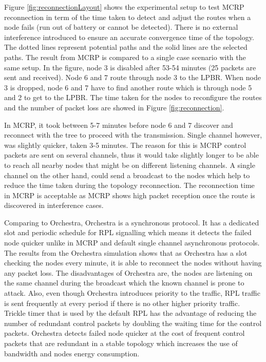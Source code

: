 
Figure \ref{fig:reconnectionLayout} shows the experimental setup to test MCRP reconnection in term of the time taken to detect and adjust the routes when a node fails (run out of battery or cannot be detected). There is no external interference introduced to ensure an accurate convergence time of the topology. The dotted lines represent potential paths and the solid lines are the selected paths. The result from MCRP is compared to a single case scenario with the same setup.
In the figure, node 3 is disabled after 53-54 minutes (25 packets are sent and received). Node 6 and 7 route through node 3 to the LPBR. When node 3 is dropped, node 6 and 7 have to find another route which is through node 5 and 2 to get to the LPBR. The time taken for the nodes to reconfigure the routes and the number of packet loss are showed in Figure \ref{fig:reconnection}. 

In MCRP, it took between 5-7 minutes before node 6 and 7 discover and reconnect with the tree to proceed with the transmission. Single channel however, was slightly quicker, taken 3-5 minutes. The reason for this is MCRP control packets are sent on several channels, thus it would take slightly longer to be able to reach all nearby nodes that might be on different listening channels. A single channel on the other hand, could send a broadcast to the nodes which help to reduce the time taken during the topology reconnection.
The reconnection time in MCRP is acceptable as MCRP shows high packet reception once the route is discovered in interference cases.

Comparing to Orchestra, Orchestra is a synchronous protocol. It has a dedicated slot and periodic schedule for RPL signalling which means it detects the failed node quicker unlike in MCRP and default single channel asynchronous protocols. The results from the Orchestra simulation shows that as Orchestra has a slot checking the nodes every minute, it is able to reconnect the nodes without having any packet loss. The disadvantages of Orchestra are, the nodes are listening on the same channel during the broadcast which the known channel is prone to attack. Also, even though Orchestra introduces priority to the traffic, RPL traffic is sent frequently at every period if there is no other higher priority traffic. Trickle timer that is used by the default RPL has the advantage of reducing the number of redundant control packets by doubling the waiting time for the control packets. Orchestra detects failed node quicker at the cost of frequent control packets that are redundant in a stable topology which increases the use of bandwidth and nodes energy consumption.

